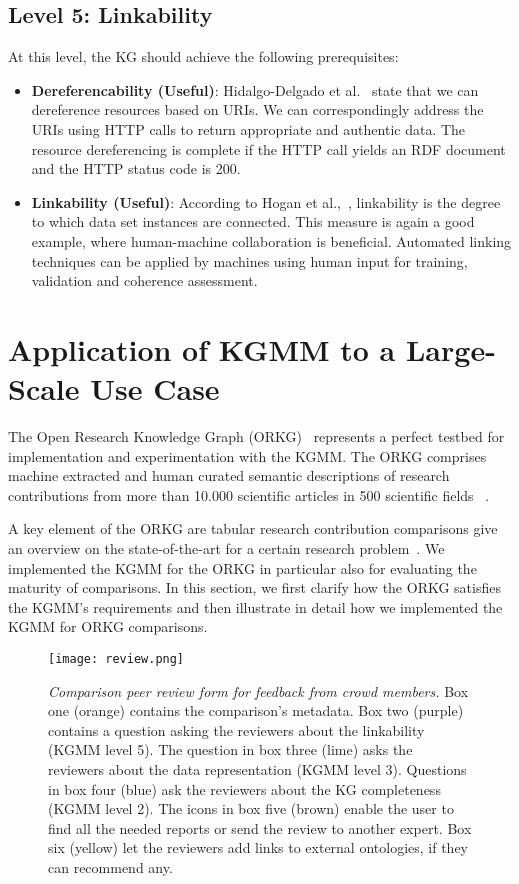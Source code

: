 \documentclass[runningheads]{llncs}
\begin{document}
\subsection{Level 5: Linkability}
At this level, the KG should achieve the following prerequisites:
\begin{itemize}
 \item \textbf {Dereferencability (Useful)}: 
 Hidalgo-Delgado et al.~\cite{Hidalgo-Delgado_quality_2021} state that we can dereference resources based on URIs. We can correspondingly address the URIs using HTTP calls to return appropriate and authentic data. The resource dereferencing is complete if the HTTP call yields an RDF document and the HTTP status code is 200.
 \item \textbf {Linkability (Useful)}: According to Hogan et al.,~\cite{hogan_knowledge_2022}, linkability is the degree to which data set instances are connected. This measure is again a good example, where human-machine collaboration is beneficial. Automated linking techniques can be applied by machines using human input for training, validation and coherence assessment.
\end{itemize}

\section{Application of KGMM to a Large-Scale Use Case}
\label{sec:use-case}

The Open Research Knowledge Graph (ORKG)~\cite{jaradeh_open_2019} represents a perfect testbed for implementation and experimentation with the KGMM.
The ORKG comprises machine extracted and human curated semantic descriptions of research contributions from more than 10.000 scientific articles in 500 scientific fields~ \cite{karras2021researcher}.

A key element of the ORKG are tabular research contribution comparisons give an overview on the state-of-the-art for a certain research problem~\cite{oelen_generate_2020}. 
We implemented the KGMM for the ORKG in particular also for evaluating the maturity of comparisons.
In this section, we first clarify how the ORKG satisfies the KGMM's requirements and then illustrate in detail how we implemented the KGMM for ORKG comparisons.
\begin{figure}
  \centering
  \texttt{[image: review.png]}
  \caption{\textit{Comparison peer review form for feedback from crowd members.} Box one (orange) contains the comparison's metadata. Box two (purple) contains a question asking the reviewers about the linkability (KGMM level 5). The question in box three (lime) asks the reviewers about the data representation (KGMM level 3). Questions in box four (blue) ask the reviewers about the KG completeness (KGMM level 2). The icons in box five (brown) enable the user to find all the needed reports or send the review to another expert. Box six (yellow) let the reviewers add links to external ontologies, if they can recommend any.}
  \label{fig:comparisonReview}
\end{figure}
\end{document}
